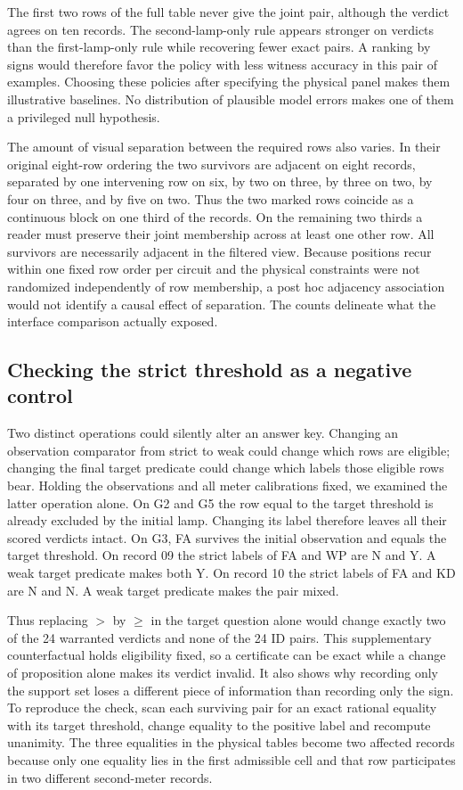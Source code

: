 \documentclass[12pt,letterpaper]{article}
\begin{document}
The first two rows of the full table never give the joint pair, although the verdict agrees on ten records. The second-lamp-only rule appears stronger on verdicts than the first-lamp-only rule while recovering fewer exact pairs. A ranking by signs would therefore favor the policy with less witness accuracy in this pair of examples. Choosing these policies after specifying the physical panel makes them illustrative baselines. No distribution of plausible model errors makes one of them a privileged null hypothesis.

The amount of visual separation between the required rows also varies. In their original eight-row ordering the two survivors are adjacent on eight records, separated by one intervening row on six, by two on three, by three on two, by four on three, and by five on two. Thus the two marked rows coincide as a continuous block on one third of the records. On the remaining two thirds a reader must preserve their joint membership across at least one other row. All survivors are necessarily adjacent in the filtered view. Because positions recur within one fixed row order per circuit and the physical constraints were not randomized independently of row membership, a post hoc adjacency association would not identify a causal effect of separation. The counts delineate what the interface comparison actually exposed.

\subsection{Checking the strict threshold as a negative control}

Two distinct operations could silently alter an answer key. Changing an observation comparator from strict to weak could change which rows are eligible; changing the final target predicate could change which labels those eligible rows bear. Holding the observations and all meter calibrations fixed, we examined the latter operation alone. On G2 and G5 the row equal to the target threshold is already excluded by the initial lamp. Changing its label therefore leaves all their scored verdicts intact. On G3, FA survives the initial observation and equals the target threshold. On record 09 the strict labels of FA and WP are N and Y. A weak target predicate makes both Y. On record 10 the strict labels of FA and KD are N and N. A weak target predicate makes the pair mixed.

Thus replacing $>$ by $\geq$ in the target question alone would change exactly two of the 24 warranted verdicts and none of the 24 ID pairs. This supplementary counterfactual holds eligibility fixed, so a certificate can be exact while a change of proposition alone makes its verdict invalid. It also shows why recording only the support set loses a different piece of information than recording only the sign. To reproduce the check, scan each surviving pair for an exact rational equality with its target threshold, change equality to the positive label and recompute unanimity. The three equalities in the physical tables become two affected records because only one equality lies in the first admissible cell and that row participates in two different second-meter records.
\end{document}
